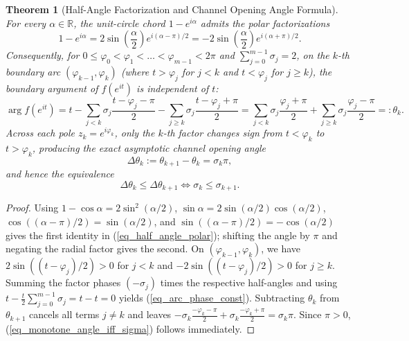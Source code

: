 \documentclass[11pt,reqno]{amsart}
\newtheorem{thm}{Theorem}[section]
\numberwithin{equation}{section}
\renewcommand{\phi}{\varphi}
\newcommand{\R}{\mathbb{R}}
\begin{document}
\begin{thm}[Half-Angle Factorization and Channel Opening Angle Formula] \label{thm_channel_opening_sigma}
For every $\alpha \in \R$, the unit-circle chord $1 - e^{i\alpha}$ admits the polar factorizations
\begin{equation} \label{eq_half_angle_polar}
  1 - e^{i\alpha} = 2\sin\!\left(\frac{\alpha}{2}\right) e^{i(\alpha - \pi)/2}
  = -2\sin\!\left(\frac{\alpha}{2}\right) e^{i(\alpha + \pi)/2}.
\end{equation}
Consequently, for $0 \le \phi_0 < \phi_1 < \dots < \phi_{m-1} < 2\pi$ and $\sum_{j=0}^{m-1} \sigma_j = 2$, on the $k$-th boundary arc $(\phi_{k-1}, \phi_k)$ (where $t > \phi_j$ for $j < k$ and $t < \phi_j$ for $j \ge k$), the boundary argument of $f(e^{it})$ is independent of $t$:
\begin{equation} \label{eq_arc_phase_const}
  \arg f(e^{it})
  = t - \sum_{j < k} \sigma_j \frac{t - \phi_j - \pi}{2} - \sum_{j \ge k} \sigma_j \frac{t - \phi_j + \pi}{2}
  = \sum_{j < k} \sigma_j \frac{\phi_j + \pi}{2} + \sum_{j \ge k} \sigma_j \frac{\phi_j - \pi}{2}
  =: \theta_k.
\end{equation}
Across each pole $z_k = e^{i\phi_k}$, only the $k$-th factor changes sign from $t < \phi_k$ to $t > \phi_k$, producing the exact asymptotic channel opening angle
\begin{equation} \label{eq_delta_theta_sigma_pi}
  \Delta\theta_k := \theta_{k+1} - \theta_k = \sigma_k \pi,
\end{equation}
and hence the equivalence
\begin{equation} \label{eq_monotone_angle_iff_sigma}
  \Delta\theta_k \le \Delta\theta_{k+1} \iff \sigma_k \le \sigma_{k+1}.
\end{equation}
\end{thm}
\begin{proof}
Using $1 - \cos\alpha = 2\sin^2(\alpha/2)$, $\sin\alpha = 2\sin(\alpha/2)\cos(\alpha/2)$, $\cos((\alpha - \pi)/2) = \sin(\alpha/2)$, and $\sin((\alpha - \pi)/2) = -\cos(\alpha/2)$ gives the first identity in (\ref{eq_half_angle_polar}); shifting the angle by $\pi$ and negating the radial factor gives the second. On $(\phi_{k-1}, \phi_k)$, we have $2\sin((t-\phi_j)/2) > 0$ for $j < k$ and $-2\sin((t-\phi_j)/2) > 0$ for $j \ge k$. Summing the factor phases $(-\sigma_j)$ times the respective half-angles and using $t - \frac{t}{2}\sum_{j=0}^{m-1} \sigma_j = t - t = 0$ yields (\ref{eq_arc_phase_const}). Subtracting $\theta_k$ from $\theta_{k+1}$ cancels all terms $j \ne k$ and leaves $-\sigma_k\frac{-\phi_k-\pi}{2} + \sigma_k\frac{-\phi_k+\pi}{2} = \sigma_k\pi$. Since $\pi > 0$, (\ref{eq_monotone_angle_iff_sigma}) follows immediately.
\end{proof}
\end{document}
